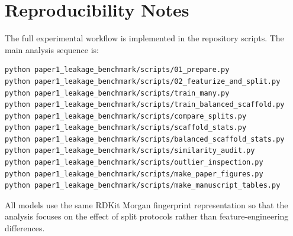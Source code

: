 \section{Reproducibility Notes}
\label{app:reproducibility}

The full experimental workflow is implemented in the repository scripts. The main analysis sequence is:

\begin{verbatim}
python paper1_leakage_benchmark/scripts/01_prepare.py
python paper1_leakage_benchmark/scripts/02_featurize_and_split.py
python paper1_leakage_benchmark/scripts/train_many.py
python paper1_leakage_benchmark/scripts/train_balanced_scaffold.py
python paper1_leakage_benchmark/scripts/compare_splits.py
python paper1_leakage_benchmark/scripts/scaffold_stats.py
python paper1_leakage_benchmark/scripts/balanced_scaffold_stats.py
python paper1_leakage_benchmark/scripts/similarity_audit.py
python paper1_leakage_benchmark/scripts/outlier_inspection.py
python paper1_leakage_benchmark/scripts/make_paper_figures.py
python paper1_leakage_benchmark/scripts/make_manuscript_tables.py
\end{verbatim}

All models use the same RDKit Morgan fingerprint representation so that the analysis focuses on the effect of split protocols rather than feature-engineering differences.
